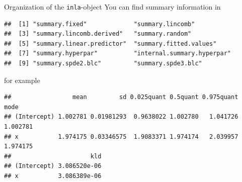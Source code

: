 \documentclass[
  ignorenonframetext,
]{beamer}
\newenvironment{Shaded}{\begin{snugshade}}{\end{snugshade}}
\newcommand{\NormalTok}[1]{#1}
\newcommand{\SpecialCharTok}[1]{\textcolor[rgb]{0.00,0.00,0.00}{#1}}
\begin{document}
\begin{frame}[fragile]{Organization of the \texttt{inla}-object}
\protect\hypertarget{organization-of-the-inla-object-1}{}
You can find summary information in \small

\begin{verbatim}
##  [1] "summary.fixed"             "summary.lincomb"          
##  [3] "summary.lincomb.derived"   "summary.random"           
##  [5] "summary.linear.predictor"  "summary.fitted.values"    
##  [7] "summary.hyperpar"          "internal.summary.hyperpar"
##  [9] "summary.spde2.blc"         "summary.spde3.blc"
\end{verbatim}

\normalsize

for example

\scriptsize

\begin{Shaded}
\end{Shaded}

\begin{verbatim}
##                 mean         sd 0.025quant 0.5quant 0.975quant     mode
## (Intercept) 1.002781 0.01981293  0.9638022 1.002780   1.041726 1.002781
## x           1.974175 0.03346575  1.9083371 1.974174   2.039957 1.974175
##                      kld
## (Intercept) 3.086520e-06
## x           3.086389e-06
\end{verbatim}

\normalsize
\end{frame}
\end{document}
